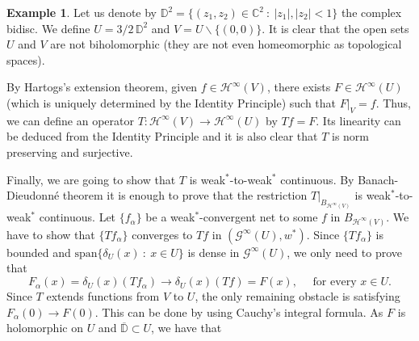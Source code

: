 \documentclass[12pt,leqno]{amsart}
\numberwithin{equation}{section} %
\theoremstyle{definition}
\newtheorem{example}[thm]{Example}
\numberwithin{equation}{section}
\begin{document}
\begin{example} Let us denote by $\mathbb{D}^2=\{(z_1,z_2)\in\mathbb{C}^2\::\: |z_1|,|z_2|<1\}$ the complex bidisc. We define $U=3/2\,\mathbb{D}^2$ and $V=U \backslash \{(0,0)\}$. It is clear that the open sets $U$ and $V$ are not biholomorphic (they are not even homeomorphic as topological spaces). 


By Hartogs's extension theorem, given $f\in\mathcal{H}^\infty(V)$, there exists $F\in\mathcal{H}^\infty(U)$ (which is uniquely determined by the Identity Principle) such that $\left.F\right|_V=f$. Thus, we can define an operator $T:\mathcal{H}^\infty(V)\to\mathcal{H}^\infty(U)$ by $Tf=F$. Its linearity can be deduced from the Identity Principle and it is also clear that $T$ is norm preserving and surjective. 

Finally, we are going to show that $T$ is weak$^*$-to-weak$^*$ continuous. By Banach-Dieudonn\'e theorem it is enough to prove that the restriction $\left.T\right|_{B_{\mathcal{H}^\infty(V)}}$ is weak$^*$-to-weak$^*$ continuous. Let $\{f_\alpha\}$ be a weak$^*$-convergent net to some $f$ in $B_{\mathcal{H}^\infty(V)}$. We have to show that $\{T f_\alpha\}$ converges to $Tf$ in $(\mathcal{G}^\infty(U),w^*)$. Since $\{T f_\alpha\}$ is bounded and $\text{span}\{\delta_U(x)\::\: x\in U\}$ is dense in $\mathcal{G}^\infty(U)$, we only need to prove that
$$
F_\alpha(x)=\delta_U(x)(Tf_\alpha)\to \delta_U(x)(Tf)=F(x), \quad \text{ for every } x\in U.
$$
Since $T$ extends functions from $V$ to $U$, the only remaining obstacle is satisfying
$
F_\alpha(0)\to F(0).
$
This can be done by using Cauchy's integral formula. As $F$ is holomorphic on $U$ and $\overline{\mathbb{D}}\subset U$, we have that



\end{example}
\end{document}
